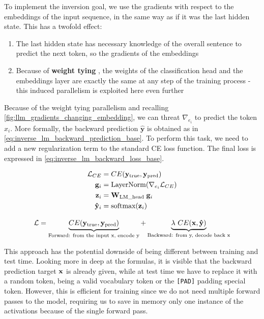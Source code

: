 \documentclass[../thesis.tex]{subfiles}
\begin{document}
To implement the inversion goal, we use the gradients with respect to the embeddings of the input sequence, in the same way as if it was the last hidden state.
This has a twofold effect:
\begin{enumerate}
    \item The last hidden state has necessary knowledge of the overall sentence to predict the next token, so the gradients of the embeddings
    \item Because of \textbf{weight tying} \citep{press2017usingoutputembeddingimprove-weighttying}, the weights of the classification head and the embeddings layer are exactly the same at any step of the training process - this induced parallelism is exploited here even further
\end{enumerate}

Because of the weight tying parallelism and recalling \cref{fig:llm_gradients_changing_embedding}, we can threat $\nabla_{e_i}$ to predict the token $x_i$.
More formally, the backward prediction $\mathbf{\hat{y}}$ is obtained as in \cref{eq:inverse_lm_backward_prediction_base}.
To perform this task, we need to add a new regularization term to the standard CE loss function. The final loss is expressed in \cref{eq:inverse_lm_backward_loss_base}.

\begin{equation}
\begin{split}
    \mathcal{L}_{CE} &= CE(\mathbf{y}_\text{true}, \mathbf{y}_\text{pred}) \\
    \mathbf{g}_i &= \text{LayerNorm}(\nabla_{e_i}\mathcal{L}_{CE}) \\
    \mathbf{z}_i &= \mathbf{W}_\text{LM\_head} \; \mathbf{g}_i \\
    \mathbf{\hat{y}}_i &= \text{softmax}(\mathbf{z}_i)
\end{split}
\label{eq:inverse_lm_backward_prediction_base}
\end{equation}

\begin{equation}
\mathcal{L} = 
\underbrace{CE(\mathbf{y}_\text{true}, \mathbf{y}_\text{pred})}_\text{Forward: from the input x, encode y}
+
\underbrace{\lambda\ CE(\mathbf{x}, \mathbf{\hat{y}})}_\text{Backward: from y, decode back x}
\label{eq:inverse_lm_backward_loss_base}
\end{equation}

This approach has the potential downside of being different between training and test time.
Looking more in deep at the formulas, it is visible that the backward prediction target $\mathbf{x}$ is already given, while at test time we have to replace it with a random token, being a valid vocabulary token or the \texttt{[PAD]} padding special token.
However, this is efficient for training since we do not need multiple forward passes to the model, requiring us to save in memory only one instance of the activations because of the single forward pass.
\end{document}
